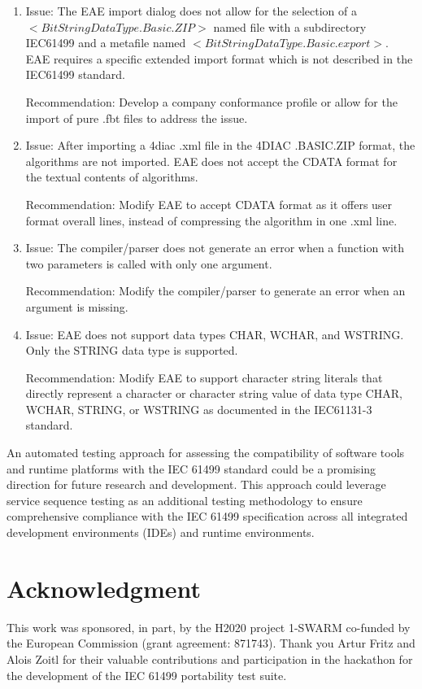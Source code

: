 \documentclass[conference]{IEEEtran}
\begin{document}
\begin{enumerate}

\item Issue: The EAE import dialog does not allow for the selection of a $<BitStringDataType.Basic.ZIP>$ named file with a subdirectory IEC61499 and a metafile named $<BitStringDataType.Basic.export>$. EAE requires a specific extended import format which is not described in the IEC61499 standard.

Recommendation: Develop a company conformance profile or allow for the import of pure .fbt files to address the issue.

\item  Issue: After importing a 4diac .xml file in the 4DIAC .BASIC.ZIP format, the algorithms are not imported. EAE does not accept the CDATA format for the textual contents of algorithms.

Recommendation: Modify EAE to accept CDATA format as it offers user format overall lines, instead of compressing the algorithm in one .xml line.

\item Issue: The compiler/parser does not generate an error when a function with two parameters is called with only one argument.

Recommendation: Modify the compiler/parser to generate an error when an argument is missing.


\item Issue: EAE does not support data types CHAR, WCHAR, and WSTRING. Only the STRING data type is supported.

Recommendation: Modify EAE to support character string literals that directly represent a character or character string value of data type CHAR, WCHAR, STRING, or WSTRING as documented in the IEC61131-3 standard.
\end{enumerate}

An automated testing approach for assessing the compatibility of software tools and runtime platforms with the IEC 61499 standard could be a promising direction for future research and development. This approach could leverage service sequence testing as an additional testing methodology to ensure comprehensive compliance with the IEC 61499 specification across all integrated development environments (IDEs) and runtime environments. 

\section*{Acknowledgment}
This work was sponsored, in part, by the H2020 project 1-SWARM co-funded by the European Commission (grant agreement: 871743). Thank you Artur Fritz and Alois Zoitl for their valuable contributions and participation in the hackathon for the development of the IEC 61499 portability test suite.



\end{document}
